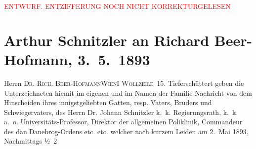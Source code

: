 
\begin{center}
            \textcolor{red}{ENTWURF. ENTZIFFERUNG NOCH NICHT KORREKTURGELESEN}
                      \end{center}
            
               \section[Arthur Schnitzler an Richard Beer-Hofmann, 3. 5. 1893]{ Arthur Schnitzler an Richard Beer-Hofmann, 3. 5. 1893}\nopagebreak{}\rehead{ }\begin{ledgroupsized}[t]{13cm}\normalsize\beginnumbering{} \toendnotes[C]{\smallbreak\pagebreak[2]} 
\pstart{}{\pb}Herrn \textsc{Dr. Rich.
                     Beer-Hofmann}\pend{}\pstart{}\textsc{Wien}\pend{}\pstart{}\textsc{I Wollzeile 15}.\pend{}{\bigskip}\pstart
           \noindent{}{\pb}Tieferschüttert geben die Unterzeichneten hiemit im
               eigenen und im Namen der Familie Nachricht von dem Hinscheiden ihres innigstgeliebten
               Gatten, resp. Vaters, Bruders und Schwiegervaters, des Herrn\pend
           \pstart
           \centering{}Dr. Johann Schnitzler\pend
           \pstart
           \noindent{}\centering{}k. k. Regierungsrath, k. k. a. o. Universitäts-Professor, Direktor der
                  allgemeinen Poliklinik, Commandeur des dän.Danebrog-Ordens etc. etc.\pend
           \pstart
           \noindent{}welcher nach kurzem Leiden am 2. Mai 1893, Nachmittags ½ 2

\end{ledgroupsized}
